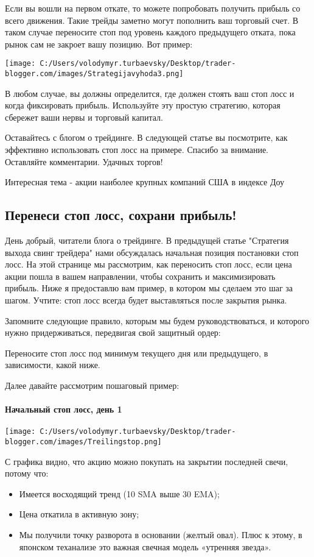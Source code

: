 \documentclass[a5paper]{article}
\begin{document}
Если вы вошли на первом откате, то можете попробовать получить прибыль
со всего движения. Такие трейды заметно могут пополнить ваш торговый
счет. В таком случае переносите стоп под уровень каждого предыдущего
отката, пока рынок сам не закроет вашу позицию. Вот пример:

\texttt{[image: C:/Users/volodymyr.turbaevsky/Desktop/trader-blogger.com/images/Strategijavyhoda3.png]}

В любом случае, вы должны определится, где должен стоять ваш стоп лосс и когда фиксировать прибыль. Используйте эту простую стратегию, которая сбережет ваши нервы и торговый капитал.

Оставайтесь с блогом о трейдинге. В следующей статье вы посмотрите, как эффективно использовать стоп лосс на примере. Спасибо за внимание. Оставляйте комментарии. Удачных торгов!


Интересная тема - акции наиболее крупных компаний США в индексе Доу

\subsection{Перенеси стоп лосс, сохрани прибыль!}

День добрый, читатели блога о трейдинге. В предыдущей статье "Стратегия выхода свинг трейдера" нами обсуждалась начальная позиция постановки стоп лосс. На этой странице мы рассмотрим, как переносить стоп лосс, если цена акции пошла в вашем направлении, чтобы сохранить и максимизировать прибыль. Ниже я предоставлю вам пример, в котором мы сделаем это шаг за шагом. Учтите: стоп лосс всегда будет выставляться после закрытия рынка.

Запомните следующие правило, которым мы будем руководствоваться, и которого нужно придерживаться, передвигая свой защитный ордер:

Переносите стоп лосс под минимум текущего дня или предыдущего, в зависимости, какой ниже.

Далее давайте рассмотрим пошаговый пример:

\paragraph{Начальный стоп лосс, день 1}

\texttt{[image: C:/Users/volodymyr.turbaevsky/Desktop/trader-blogger.com/images/Treilingstop.png]}

С графика видно, что акцию можно покупать на закрытии последней свечи, потому что:
\begin{itemize}
\item     Имеется восходящий тренд (10 SMA выше 30 EMA);
\item     Цена откатила в активную зону;
\item     Мы получили точку разворота в основании (желтый овал). Плюс к этому, в японском теханализе это важная свечная модель «утренняя звезда».
\end{itemize}
\end{document}
